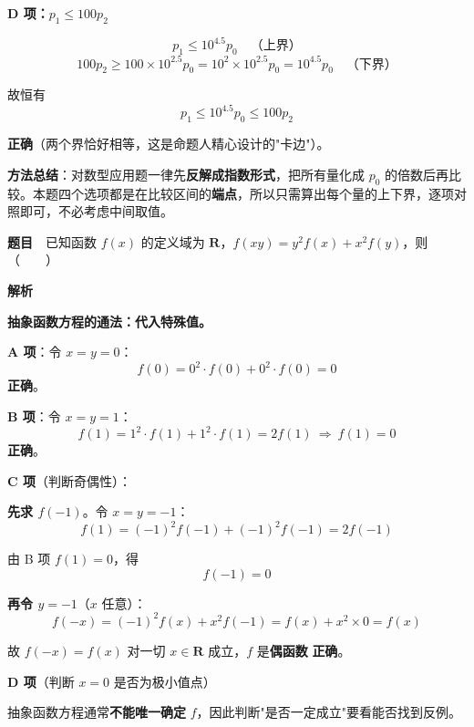 \textbf{D 项：$p_1\le100p_2$ }

\[p_1\le10^{4.5}p_0\quad\text{（上界）}\]
\[100p_2\ge100\times10^{2.5}p_0=10^{2}\times10^{2.5}p_0=10^{4.5}p_0\quad\text{（下界）}\]

故恒有
\[p_1\le10^{4.5}p_0\le100p_2\]

 \textbf{正确}（两个界恰好相等，这是命题人精心设计的"卡边"）。


\begin{gktip}
\textbf{方法总结}：对数型应用题一律先\textbf{反解成指数形式}，把所有量化成 $p_0$ 的倍数后再比较。本题四个选项都是在比较区间的\textbf{端点}，所以只需算出每个量的上下界，逐项对照即可，不必考虑中间取值。
\end{gktip}

\par\medskip


\textbf{题目}　已知函数 $f(x)$ 的定义域为 $\mathbf R$，$f(xy)=y^{2}f(x)+x^{2}f(y)$，则（　　）

\textbf{解析}

\textbf{抽象函数方程的通法：代入特殊值。}

\par\medskip

\textbf{A 项}：令 $x=y=0$：
\[f(0)=0^{2}\cdot f(0)+0^{2}\cdot f(0)=0\]
 \textbf{正确}。

\par\medskip

\textbf{B 项}：令 $x=y=1$：
\[f(1)=1^{2}\cdot f(1)+1^{2}\cdot f(1)=2f(1)\ \Longrightarrow\ f(1)=0\]
 \textbf{正确}。

\par\medskip

\textbf{C 项}（判断奇偶性）：

\textbf{先求 $f(-1)$}。令 $x=y=-1$：
\[f(1)=(-1)^{2}f(-1)+(-1)^{2}f(-1)=2f(-1)\]

由 B 项 $f(1)=0$，得
\[f(-1)=0\]

\textbf{再令 $y=-1$}（$x$ 任意）：
\[f(-x)=(-1)^{2}f(x)+x^{2}f(-1)=f(x)+x^{2}\times0=f(x)\]

故 $f(-x)=f(x)$ 对一切 $x\in\mathbf R$ 成立，$f$ 是\textbf{偶函数}  \textbf{正确}。

\par\medskip

\textbf{D 项}（判断 $x=0$ 是否为极小值点）

抽象函数方程通常\textbf{不能唯一确定} $f$，因此判断"是否一定成立"要看能否找到反例。

